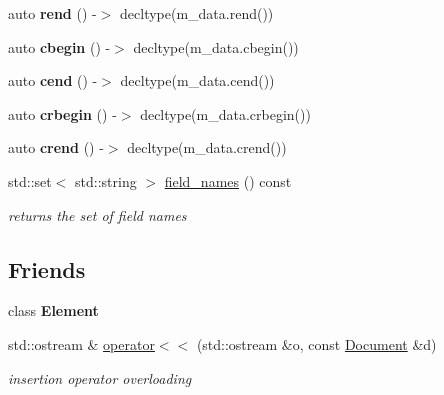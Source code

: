 \begin{DoxyCompactItemize}
\item 
\hypertarget{classbson_1_1_document_a3dbd675ec728ae5e5869f96e2e341b3d}{auto {\bfseries rend} () -\/$>$ decltype(m\+\_\+data.\+rend())}\label{classbson_1_1_document_a3dbd675ec728ae5e5869f96e2e341b3d}

\item 
\hypertarget{classbson_1_1_document_a981b86245cd36a13432e66c14329d585}{auto {\bfseries cbegin} () -\/$>$ decltype(m\+\_\+data.\+cbegin())}\label{classbson_1_1_document_a981b86245cd36a13432e66c14329d585}

\item 
\hypertarget{classbson_1_1_document_a1b3d3866623fd1953f5a70b337c2b18a}{auto {\bfseries cend} () -\/$>$ decltype(m\+\_\+data.\+cend())}\label{classbson_1_1_document_a1b3d3866623fd1953f5a70b337c2b18a}

\item 
\hypertarget{classbson_1_1_document_a050381182bf3f92ac472950cc62a14b4}{auto {\bfseries crbegin} () -\/$>$ decltype(m\+\_\+data.\+crbegin())}\label{classbson_1_1_document_a050381182bf3f92ac472950cc62a14b4}

\item 
\hypertarget{classbson_1_1_document_a1667c39ae48b51087452e34f6200ebe9}{auto {\bfseries crend} () -\/$>$ decltype(m\+\_\+data.\+crend())}\label{classbson_1_1_document_a1667c39ae48b51087452e34f6200ebe9}

\item 
std\+::set$<$ std\+::string $>$ \hyperlink{classbson_1_1_document_a4d0e6f7f9d1ba20e709ddc7e46bd00a0}{field\+\_\+names} () const 
\begin{DoxyCompactList}\small\item\em returns the set of field names \end{DoxyCompactList}\end{DoxyCompactItemize}
\subsection*{Friends}
\begin{DoxyCompactItemize}
\item 
\hypertarget{classbson_1_1_document_a016b821f88c7c0a2de1451c175cefbf9}{class {\bfseries Element}}\label{classbson_1_1_document_a016b821f88c7c0a2de1451c175cefbf9}

\item 
std\+::ostream \& \hyperlink{classbson_1_1_document_a66f02c1ef7b76d9bc4373b503585c6e9}{operator$<$$<$} (std\+::ostream \&o, const \hyperlink{classbson_1_1_document}{Document} \&d)
\begin{DoxyCompactList}\small\item\em insertion operator overloading \end{DoxyCompactList}\end{DoxyCompactItemize}


